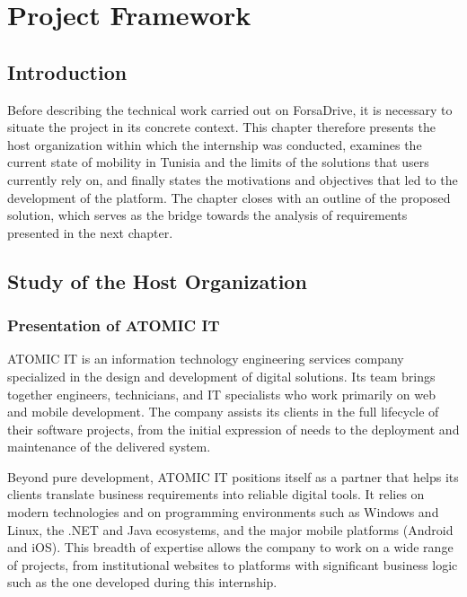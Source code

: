 \chapter{Project Framework}

\clearpage
\section*{Introduction}

Before describing the technical work carried out on ForsaDrive, it is necessary to situate the project in its concrete context. This chapter therefore presents the host organization within which the internship was conducted, examines the current state of mobility in Tunisia and the limits of the solutions that users currently rely on, and finally states the motivations and objectives that led to the development of the platform. The chapter closes with an outline of the proposed solution, which serves as the bridge towards the analysis of requirements presented in the next chapter.


\section{Study of the Host Organization}

\subsection{Presentation of ATOMIC IT}

ATOMIC IT is an information technology engineering services company specialized in the design and development of digital solutions. Its team brings together engineers, technicians, and IT specialists who work primarily on web and mobile development. The company assists its clients in the full lifecycle of their software projects, from the initial expression of needs to the deployment and maintenance of the delivered system.

Beyond pure development, ATOMIC IT positions itself as a partner that helps its clients translate business requirements into reliable digital tools. It relies on modern technologies and on programming environments such as Windows and Linux, the .NET and Java ecosystems, and the major mobile platforms (Android and iOS). This breadth of expertise allows the company to work on a wide range of projects, from institutional websites to platforms with significant business logic such as the one developed during this internship.

